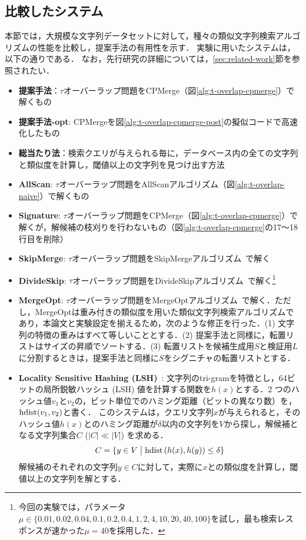 \documentclass[japanese]{jnlp_JS2.0}
\begin{document}
\subsection{比較したシステム}

本節では，大規模な文字列データセットに対して，種々の類似文字列検索アルゴリズムの性能を比較し，提案手法の有用性を示す．
実験に用いたシステムは，以下の通りである．
なお，先行研究の詳細については，\ref{sec:related-work}節を参照されたい．
\begin{itemize}
	\item {\bf 提案手法}：$\tau$オーバーラップ問題をCPMerge（図\ref{alg:t-overlap-cpmerge}）で解くもの
	\item {\bf 提案手法-opt}: CPMergeを図\ref{alg:t-overlap-cpmerge-post}の擬似コードで高速化したもの
	\item {\bf 総当たり法}：検索クエリが与えられる毎に，データベース内の全ての文字列と類似度を計算し，閾値以上の文字列を見つけ出す方法
	\item {\bf AllScan}: $\tau$オーバーラップ問題をAllScanアルゴリズム（図\ref{alg:t-overlap-naive}）で解くもの
	\item {\bf Signature}: $\tau$オーバーラップ問題をCPMerge（図\ref{alg:t-overlap-cpmerge}）で解くが，解候補の枝刈りを行わないもの（図\ref{alg:t-overlap-cpmerge}の17〜18行目を削除）
	\item {\bf SkipMerge}: $\tau$オーバーラップ問題をSkipMergeアルゴリズム~\cite{Li:08}で解く
	\item {\bf DivideSkip}: $\tau$オーバーラップ問題をDivideSkipアルゴリズム~\cite{Li:08}で解く\footnote{今回の実験では，パラメータ$\mu \in \{0.01, 0.02, 0.04, 0.1, 0.2, 0.4, 1, 2, 4, 10, 20, 40, 100\}$を試し，最も検索レスポンスが速かった$\mu = 40$を採用した．}
	\item {\bf MergeOpt}: $\tau$オーバーラップ問題をMergeOptアルゴリズム~\cite{Sarawagi:04}で解く．ただし，MergeOptは重み付きの類似度を用いた類似文字列検索アルゴリズムであり，本論文と実験設定を揃えるため，次のような修正を行った．(1) 文字列の特徴の重みはすべて等しいこととする．(2) 提案手法と同様に，転置リストはサイズの昇順でソートする．(3) 転置リストを候補生成用$S$と検証用$L$に分割するときは，提案手法と同様に$S$をシグニチャの転置リストとする．
	\item {\bf Locality Sensitive Hashing (LSH)}~\cite{Andoni:08,Ravichandran:06}:
	文字列のtri-gramを特徴とし，64ビットの局所鋭敏ハッシュ (LSH) 値を計算する関数を$h(x)$とする．2 つのハッシュ値$v_1$と$v_2$の，ビット単位でのハミング距離（ビットの異なり数）を，${\rm hdist}(v_1, v_2)$と書く．
	このシステムは，クエリ文字列$x$が与えられると，そのハッシュ値$h(x)$とのハミング距離が$\delta$以内の文字列を$V$から探し，解候補となる文字列集合$C$ ($|C| \ll |V|$) を求める．
	\begin{equation}
		C = \{y \in V \bigm| {\rm hdist}\left(h(x), h(y)\right) \leq \delta \} \label{equ:LSH-candidate}
	\end{equation}
	解候補のそれぞれの文字列$y \in C$に対して，実際に$x$との類似度を計算し，閾値以上の文字列を解とする．


\end{itemize}
\end{document}
